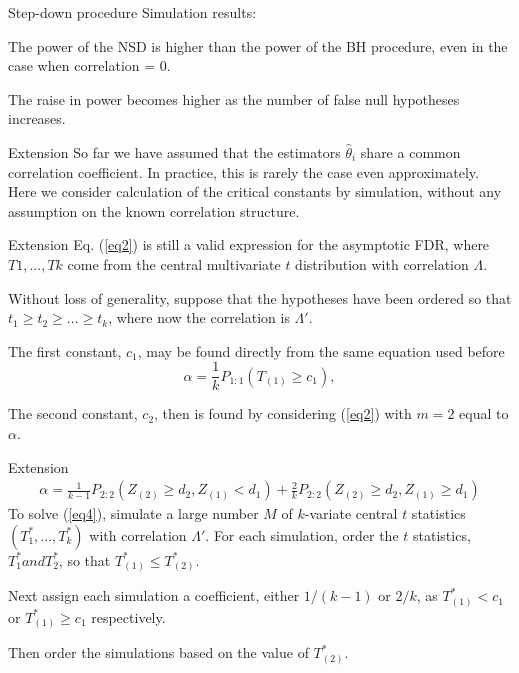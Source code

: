 \documentclass{beamer}
\begin{document}
\begin{frame}[t]{Step-down procedure}\vspace{10pt}
Simulation results:

The power of the NSD is higher than the power of the BH procedure, even in the case when correlation = 0.

The raise in power becomes higher as the number of false null hypotheses increases.
\end{frame}

\begin{frame}[t]{Extension}\vspace{10pt}
So far we have assumed that the estimators $\hat{\theta}_i$ share a common correlation coefficient. In practice, this is rarely the case even approximately. Here we consider calculation of the critical constants by simulation, without any assumption on the known correlation structure.
\end{frame}

\begin{frame}[t]{Extension}\vspace{10pt}
Eq. (\ref{eq2}) is still a valid expression for the asymptotic FDR, where $T1,...,Tk$ come from the central multivariate $t$ distribution with correlation $\Lambda$.

Without loss of generality, suppose that the hypotheses have been ordered so that $t_1\geq t_2\geq...\geq t_k$, where now the correlation is $\Lambda'$.

The first constant, $c_1$, may be found directly from the same equation used before
$$ \alpha = \frac{1}{k}P_{1:1}(T_{(1)} \geq c_1) ,$$

The second constant, $c_2$, then is found by considering  (\ref{eq2}) with $m = 2$ equal to $\alpha$.
\end{frame}

\begin{frame}[t]{Extension}\vspace{10pt}
\begin{multline} \label{eq4}
\alpha = \frac{1}{k-1}P_{2:2}(Z_{(2)} \geq d_2,Z_{(1)}<d_1)+ \frac{2}{k} P_{2:2}(Z_{(2)} \geq d_2,Z_{(1)} \geq d_1)
\end{multline} 
To solve (\ref{eq4}), simulate a large number $M$ of $k$-variate central $t$ statistics $(T^*_1,...,T^*_k)$ with correlation $\Lambda'$. For each simulation, order the $t$ statistics,$T^*_1 and T^*_2$, so that $T^*_{(1)} \leq T^*_{(2)}$.

Next assign each simulation a coefficient, either $1/(k-1)$ or $2/k$, as $T^*_{(1)} < c_1$ or $T^*_{(1)} \geq c_1$ respectively.

Then order the simulations based on the value of $T^*_{(2)}$.

\end{frame}
\end{document}
